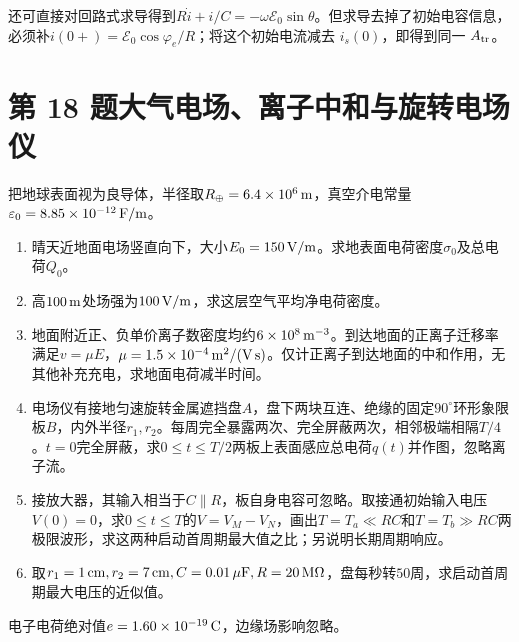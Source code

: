 \documentclass[UTF8,fontset=fandol,a4paper,11pt]{ctexart}
\begin{document}
还可直接对回路式求导得到$R\dot i+i/C=-\omega\mathcal E_0\sin\theta$。但求导去掉了初始电容信息，必须补$i(0+)=\mathcal E_0\cos\varphi_e/R$；将这个初始电流减去 $i_s(0)$，即得到同一 $A_{\rm tr}$。




\section*{第 18 题\quad 大气电场、离子中和与旋转电场仪}\label{q:18}


把地球表面视为良导体，半径取$R_\oplus=6.4\times10^6\,{\rm m}$，真空介电常量$\varepsilon_0=8.85\times10^{-12}\,{\rm F/m}$。
\begin{enumerate}
\item 晴天近地面电场竖直向下，大小$E_0=150\,{\rm V/m}$。求地表面电荷密度$\sigma_0$及总电荷$Q_0$。
\item 高$100\,{\rm m}$处场强为$100\,{\rm V/m}$，求这层空气平均净电荷密度。
\item 地面附近正、负单价离子数密度均约$6\times10^8\,{\rm m^{-3}}$。到达地面的正离子迁移率满足$v=\mu E$，$\mu=1.5\times10^{-4}\,{\rm m^2/(V\,s)}$。仅计正离子到达地面的中和作用，无其他补充充电，求地面电荷减半时间。
\item 电场仪有接地匀速旋转金属遮挡盘$A$，盘下两块互连、绝缘的固定$90^\circ$环形象限板$B$，内外半径$r_1,r_2$。每周完全暴露两次、完全屏蔽两次，相邻极端相隔$T/4$。$t=0$完全屏蔽，求$0\le t\le T/2$两板上表面感应总电荷$q(t)$并作图，忽略离子流。
\item 接放大器，其输入相当于$C\parallel R$，板自身电容可忽略。取接通初始输入电压$V(0)=0$，求$0\le t\le T$的$V=V_M-V_N$，画出$T=T_a\ll RC$和$T=T_b\gg RC$两极限波形，求这两种启动首周期最大值之比；另说明长期周期响应。
\item 取$r_1=1\,{\rm cm},r_2=7\,{\rm cm},C=0.01\,\mu{\rm F},R=20\,{\rm M}\Omega$，盘每秒转$50$周，求启动首周期最大电压的近似值。
\end{enumerate}
电子电荷绝对值$e=1.60\times10^{-19}\,{\rm C}$，边缘场影响忽略。
\end{document}
